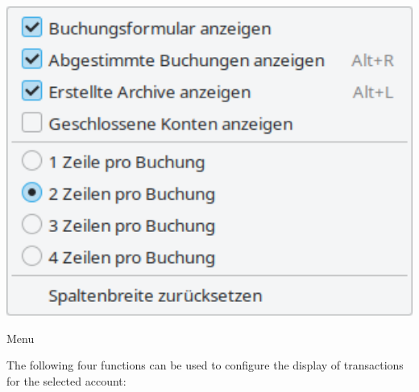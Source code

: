 \begin{minipage}{.3\linewidth}
	\centering						%
	\includegraphics[width=1\textwidth]{image/screenshot/home_menubar_view}
	\vspace{-20pt}					%
	\captionsetup{
	type=figure,%
	name=Fig.,%
	labelsep=newline}			%
	\caption{ Menu}		%
	\label{home_menubar_view}
\end{minipage}
\vspace{2mm}
\begin{addmargin*}[0pt]{.7cm} 	%
The following four functions can be used to configure the display of transactions for the selected account:
\end{addmargin*}
\vspace{-2mm}
